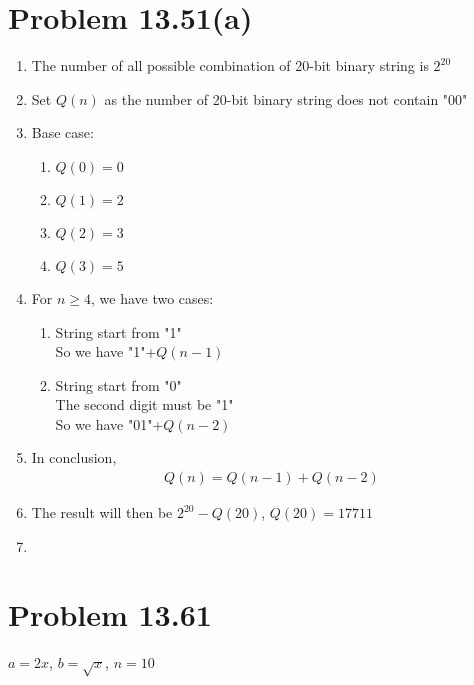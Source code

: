 \documentclass{article}
\def\math#1{$#1$}
\begin{document}
\section{Problem 13.51(a)}
\begin{enumerate}
    \item The number of all possible combination of 20-bit binary string is \math{2^{20}}
    \item Set \math{Q(n)} as the number of 20-bit binary string does not contain "00"
    \item Base case: 
        \begin{enumerate}
            \item \math{Q(0) = 0}
            \item \math{Q(1) = 2}
            \item \math{Q(2) = 3}
            \item \math{Q(3) = 5}
        \end{enumerate}
    \item For \math{n \geq 4}, we have two cases:
        \begin{enumerate}
            \item String start from "1" \\
                So we have "1"+\math{Q(n - 1)}
            \item String start from "0" \\
                The second digit must be "1" \\
                So we have "01"+\math{Q(n - 2)}
        \end{enumerate}
    \item In conclusion, \begin{equation}
            \begin{split}
                Q(n) = Q(n - 1) + Q(n - 2)
            \end{split}
        \end{equation}
    \item The result will then be \math{2^{20} - Q(20)}, \math{Q(20) = 17711}
    \item 
\end{enumerate}

\section{Problem 13.61}

\math{a = 2x}, \math{b = \sqrt{x}}, \math{n = 10} \\
\end{document}
